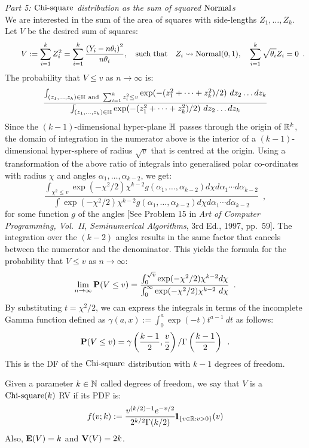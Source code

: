 {\em Part 5: $\mbox{{\rm Chi-square}}$ distribution as the sum of squared $\mbox{{\rm Normal}}$s}\\
We are interested in the sum of the area of squares with side-lengths $Z_1,\ldots,Z_k$.  Let $V$ be the desired sum of squares:
\[
\qquad V := \sum_{i=1}^k Z_i^2 =  \sum_{i=1}^k \frac{\left(Y_i - n \theta_i \right)^2}{{n \theta_i}}  , \quad \text{such that} \quad Z_i \rightsquigarrow \mbox{{\rm Normal}}(0,1), \quad \sum_{i=1}^k \sqrt{\theta_i} Z_i = 0 \enspace .
\]
The probability that $V \leq v$ as $n \to \infty$ is:
\[
\frac{\int_{\substack{(z_1,\ldots,z_k) \in \mathbb{H} \ \text{and} \ \sum_{i=1}^k{z_i^2} \leq v}} \exp(-(z_1^2+\cdots+z_k^2)/2) \ dz_2\ldots dz_k} {\int_{\substack{(z_1,\ldots,z_k) \in \mathbb{H}}} \exp(-(z_1^2+\cdots+z_k^2)/2) \ dz_2\ldots dz_k}
\]
Since the $(k-1)$-dimensional hyper-plane $\mathbb{H}$ passes through the origin of  $\mathbb{R}^k$, the domain of integration in the numerator above is the interior of a $(k-1)$-dimensional hyper-sphere of radius $\sqrt{v}$ that is centred at the origin.  Using a transformation of the above ratio of integrals into generalised polar co-ordinates with radius $\chi$  and angles $\alpha_1,\ldots,\alpha_{k-2}$, we get:
\[
\frac{\int_{\chi^2\leq v} \exp(-\chi^2/2) \chi^{k-2} g(\alpha_1,\ldots,\alpha_{k-2}) d \chi d \alpha_1\cdots d \alpha_{k-2}} {\int \exp(-\chi^2/2) \chi^{k-2} g(\alpha_1,\ldots,\alpha_{k-2}) d \chi d \alpha_1\cdots d \alpha_{k-2}} \enspace ,
\]
for some function $g$ of the angles [See Problem 15 in {\em Art of Computer Programming, Vol.~II, Seminumerical Algorithms}, 3rd Ed., 1997, pp.~59].   The integration over the $(k-2)$ angles results in the same factor that cancels between the numerator and the denominator.  This yields the formula for the probability that $V \leq v$ as $n \rightarrow \infty$:
\[
\lim_{n \to \infty} \mathbf{P}(V \leq v) =  \frac{\int_0^{\sqrt{v}}\exp(-\chi^2/2) \chi^{k-2} d \chi} {\int_0^{\infty}\exp(-\chi^2/2) \chi^{k-2} \ d \chi} \enspace .
\]  
By substituting $t=\chi^2/2$, we can express the integrals in terms of the incomplete Gamma function defined as $\gamma(a,x) :=  \int_0^{a} \exp(-t) t^{a-1} \ dt$ as follows:
\[
\mathbf{P}(V \leq v) = \gamma \left( \frac{k-1}{2},\frac{v}{2} \right) / \Gamma \left(\frac{k-1}{2} \right) \enspace .
\]
This is the DF of the $\mbox{{\rm Chi-square}}$ distribution with $k-1$ degrees of freedom.

\begin{model}[$\chisquare(k)$ RV]  Given a parameter $k \in \mathbb{N}$ called degrees of freedom, we say that $V$ is a $\chisquare(k)$ RV if its PDF is:
\[
f(v; k) :=  \frac{v^{(k/2)-1}e^{-v/2}}{2^{k/2}\Gamma(k/2)} {1}\mspace{-11 mu}{1}_{\{v \in \mathbb{R}: v>0\}}(v)
\]
Also, $\mathbf{E}(V)=k$ and $\mathbf{V}(V) = 2k$.
\end{model}

